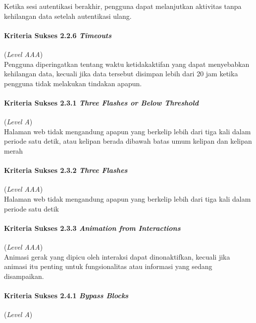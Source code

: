 Ketika sesi autentikasi berakhir, pengguna dapat melanjutkan aktivitas tanpa kehilangan data setelah autentikasi ulang.

\paragraph{Kriteria Sukses 2.2.6 \textit{Timeouts}}
\label{subsec:kriteria_2.2.6}
(\textit{Level AAA}) \\

Pengguna diperingatkan tentang waktu ketidakaktifan yang dapat menyebabkan kehilangan data, kecuali jika data tersebut disimpan lebih dari 20 jam ketika pengguna tidak melakukan tindakan apapun.

\paragraph{Kriteria Sukses 2.3.1 \textit{Three Flashes or Below Threshold}}
\label{subsec:kriteria_2.3.1}
(\textit{Level A}) \\

Halaman web tidak mengandung apapun yang berkelip lebih dari tiga kali dalam periode satu detik, atau kelipan berada dibawah batas umum kelipan dan kelipan merah

\paragraph{Kriteria Sukses 2.3.2 \textit{Three Flashes}}
\label{subsec:kriteria_2.3.2}
(\textit{Level AAA}) \\

Halaman web tidak mengandung apapun yang berkelip lebih dari tiga kali dalam periode satu detik


\paragraph{Kriteria Sukses 2.3.3 \textit{Animation from Interactions}}
\label{subsec:kriteria_2.3.3}
(\textit{Level AAA}) \\

Animasi gerak yang dipicu oleh interaksi dapat dinonaktifkan, kecuali jika animasi itu penting untuk fungsionalitas atau informasi yang sedang disampaikan.

\paragraph{Kriteria Sukses 2.4.1 \textit{Bypass Blocks}}
\label{subsec:kriteria_2.4.1}
(\textit{Level A}) \\

